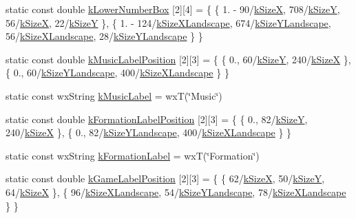 \begin{DoxyCompactItemize}
\item 
static const double \hyperlink{a00222_a86581dcc2cf8e10c2913c36f43adbc56}{k\-Lower\-Number\-Box} \mbox{[}2\mbox{]}\mbox{[}4\mbox{]} = \{ \{ 1. -\/ 90/\hyperlink{a00222_af38ec7276eab5e69e2b8b9b74c7e410d}{k\-Size\-X}, 708/\hyperlink{a00222_a96b810fae104880234d8c31ca2b86416}{k\-Size\-Y}, 56/\hyperlink{a00222_af38ec7276eab5e69e2b8b9b74c7e410d}{k\-Size\-X}, 22/\hyperlink{a00222_a96b810fae104880234d8c31ca2b86416}{k\-Size\-Y} \}, \{ 1. -\/ 124/\hyperlink{a00222_a6a5b0e2bab47c3fb6da928006951ed06}{k\-Size\-X\-Landscape}, 674/\hyperlink{a00222_a2874803a217d546e2cc3fe8647bc8506}{k\-Size\-Y\-Landscape}, 56/\hyperlink{a00222_a6a5b0e2bab47c3fb6da928006951ed06}{k\-Size\-X\-Landscape}, 28/\hyperlink{a00222_a2874803a217d546e2cc3fe8647bc8506}{k\-Size\-Y\-Landscape} \} \}
\item 
static const double \hyperlink{a00222_a8ded16e9b3dd1bb8591f298d6e24a6ec}{k\-Music\-Label\-Position} \mbox{[}2\mbox{]}\mbox{[}3\mbox{]} = \{ \{ 0., 60/\hyperlink{a00222_a96b810fae104880234d8c31ca2b86416}{k\-Size\-Y}, 240/\hyperlink{a00222_af38ec7276eab5e69e2b8b9b74c7e410d}{k\-Size\-X} \}, \{ 0., 60/\hyperlink{a00222_a2874803a217d546e2cc3fe8647bc8506}{k\-Size\-Y\-Landscape}, 400/\hyperlink{a00222_a6a5b0e2bab47c3fb6da928006951ed06}{k\-Size\-X\-Landscape} \} \}
\item 
static const wx\-String \hyperlink{a00222_a652746985359ab0e9a3a6399cf13f3ac}{k\-Music\-Label} = wx\-T(\char`\"{}Music\char`\"{})
\item 
static const double \hyperlink{a00222_a8177bc66dc20326e373180e39c56355e}{k\-Formation\-Label\-Position} \mbox{[}2\mbox{]}\mbox{[}3\mbox{]} = \{ \{ 0., 82/\hyperlink{a00222_a96b810fae104880234d8c31ca2b86416}{k\-Size\-Y}, 240/\hyperlink{a00222_af38ec7276eab5e69e2b8b9b74c7e410d}{k\-Size\-X} \}, \{ 0., 82/\hyperlink{a00222_a2874803a217d546e2cc3fe8647bc8506}{k\-Size\-Y\-Landscape}, 400/\hyperlink{a00222_a6a5b0e2bab47c3fb6da928006951ed06}{k\-Size\-X\-Landscape} \} \}
\item 
static const wx\-String \hyperlink{a00222_ae5a0e1ae8b6fe484334e0c161c4e2331}{k\-Formation\-Label} = wx\-T(\char`\"{}Formation\char`\"{})
\item 
static const double \hyperlink{a00222_a646d182bcfafe7ee196db119ce9fc544}{k\-Game\-Label\-Position} \mbox{[}2\mbox{]}\mbox{[}3\mbox{]} = \{ \{ 62/\hyperlink{a00222_af38ec7276eab5e69e2b8b9b74c7e410d}{k\-Size\-X}, 50/\hyperlink{a00222_a96b810fae104880234d8c31ca2b86416}{k\-Size\-Y}, 64/\hyperlink{a00222_af38ec7276eab5e69e2b8b9b74c7e410d}{k\-Size\-X} \}, \{ 96/\hyperlink{a00222_a6a5b0e2bab47c3fb6da928006951ed06}{k\-Size\-X\-Landscape}, 54/\hyperlink{a00222_a2874803a217d546e2cc3fe8647bc8506}{k\-Size\-Y\-Landscape}, 78/\hyperlink{a00222_a6a5b0e2bab47c3fb6da928006951ed06}{k\-Size\-X\-Landscape} \} \}

\end{DoxyCompactItemize}
